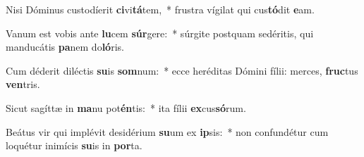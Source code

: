 \item Nisi Dóminus custodíerit \textbf{ci}vi\textbf{tá}tem,~* frustra vígilat qui cus\textbf{tó}dit \textbf{e}am.
\item Vanum est vobis ante \textbf{lu}cem \textbf{súr}gere:~* súrgite postquam sedéritis, qui manducátis \textbf{pa}nem do\textbf{ló}ris.
\item Cum déderit diléctis \textbf{su}is \textbf{som}num:~* ecce heréditas Dómini fílii: merces, \textbf{fruc}tus \textbf{ven}tris.
\item Sicut sagíttæ in \textbf{ma}nu pot\textbf{én}tis:~* ita fílii \textbf{ex}cus\textbf{só}rum.
\item Beátus vir qui implévit desidérium \textbf{su}um ex \textbf{ip}sis:~* non confundétur cum loquétur inimícis \textbf{su}is in \textbf{por}ta.
